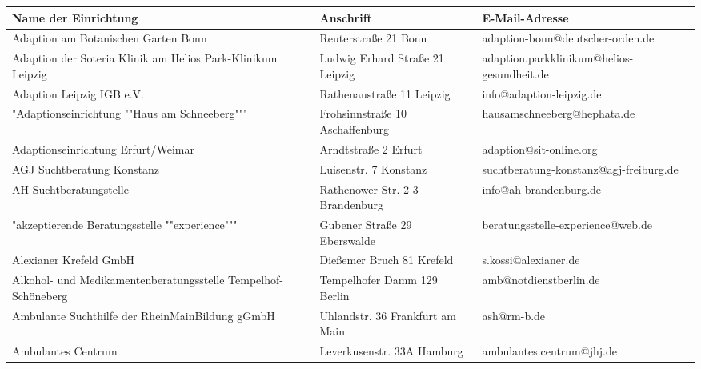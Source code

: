 ﻿{
\small
\renewcommand{\arraystretch}{1.1}
\begin{xltabular}{\textwidth} {
 >{\raggedright\arraybackslash}p{5cm}
 >{\raggedright\arraybackslash}X
 >{\raggedright\arraybackslash}p{5cm} }
 \toprule
Name der Einrichtung & Anschrift & E-Mail-Adresse \\
\midrule
Adaption am Botanischen Garten Bonn & Reuterstraße 21 Bonn & adaption-bonn@deutscher-orden.de \\
Adaption der Soteria Klinik am Helios Park-Klinikum Leipzig & Ludwig Erhard Straße 21 Leipzig & adaption.parkklinikum@helios-gesundheit.de \\
Adaption Leipzig IGB e.V. & Rathenaustraße 11 Leipzig & info@adaption-leipzig.de \\
"Adaptionseinrichtung ""Haus am Schneeberg""" & Frohsinnstraße 10 Aschaffenburg & hausamschneeberg@hephata.de \\
Adaptionseinrichtung Erfurt/Weimar & Arndtstraße 2 Erfurt & adaption@sit-online.org \\
AGJ Suchtberatung Konstanz & Luisenstr. 7 Konstanz & suchtberatung-konstanz@agj-freiburg.de \\
AH Suchtberatungstelle & Rathenower Str. 2-3 Brandenburg & info@ah-brandenburg.de \\
"akzeptierende Beratungsstelle ""experience""" & Gubener Straße 29 Eberswalde & beratungsstelle-experience@web.de \\
Alexianer Krefeld GmbH & Dießemer Bruch 81 Krefeld & s.kossi@alexianer.de \\
Alkohol- und Medikamentenberatungsstelle Tempelhof-Schöneberg & Tempelhofer Damm 129 Berlin & amb@notdienstberlin.de \\
Ambulante Suchthilfe der RheinMainBildung gGmbH & Uhlandstr. 36 Frankfurt am Main & ash@rm-b.de \\
Ambulantes Centrum & Leverkusenstr. 33A Hamburg & ambulantes.centrum@jhj.de \\

\end{xltabular}}

